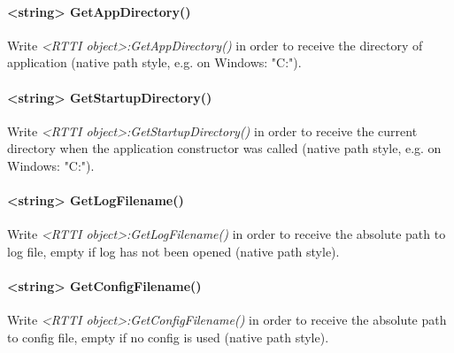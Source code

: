 \paragraph{<string> GetAppDirectory()}
Write \emph{<RTTI object>:GetAppDirectory()} in order to receive the directory of application (native path style, e.g. on Windows: "C:\MyApplication").

\paragraph{<string> GetStartupDirectory()}
Write \emph{<RTTI object>:GetStartupDirectory()} in order to receive the current directory when the application constructor was called (native path style, e.g. on Windows: "C:\MyApplication{}").

\paragraph{<string> GetLogFilename()}
Write \emph{<RTTI object>:GetLogFilename()} in order to receive the absolute path to log file, empty if log has not been opened (native path style).

\paragraph{<string> GetConfigFilename()}
Write \emph{<RTTI object>:GetConfigFilename()} in order to receive the absolute path to config file, empty if no config is used (native path style).
